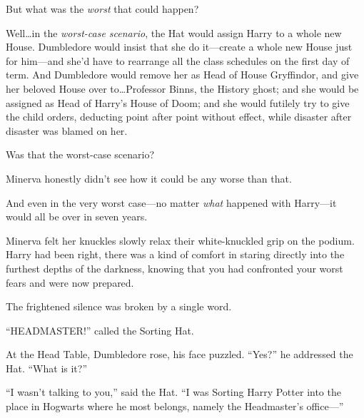 But what was the \emph{worst} that could happen?

Well…in the \emph{worst-case scenario}, the Hat would assign Harry to a whole new House. Dumbledore would insist that she do it—create a whole new House just for him—and she’d have to rearrange all the class schedules on the first day of term. And Dumbledore would remove her as Head of House Gryffindor, and give her beloved House over to…Professor Binns, the History ghost; and she would be assigned as Head of Harry’s House of Doom; and she would futilely try to give the child orders, deducting point after point without effect, while disaster after disaster was blamed on her.

Was that the worst-case scenario?

Minerva honestly didn’t see how it could be any worse than that.

And even in the very worst case—no matter \emph{what} happened with Harry—it would all be over in seven years.

Minerva felt her knuckles slowly relax their white-knuckled grip on the podium. Harry had been right, there was a kind of comfort in staring directly into the furthest depths of the darkness, knowing that you had confronted your worst fears and were now prepared.

The frightened silence was broken by a single word.

“HEADMASTER!” called the Sorting Hat.

At the Head Table, Dumbledore rose, his face puzzled. “Yes?” he addressed the Hat. “What is it?”

“I wasn’t talking to you,” said the Hat. “I was Sorting Harry Potter into the place in Hogwarts where he most belongs, namely the Headmaster’s office—”

